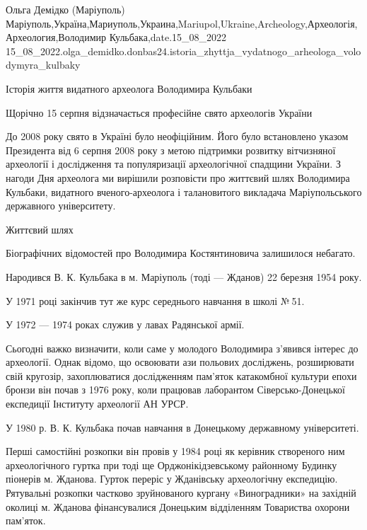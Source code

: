  
 
 
 
 

Ольга Демідко (Маріуполь)
Маріуполь,Україна,Мариуполь,Украина,Mariupol,Ukraine,Archeology,Археологія,Археология,Володимир Кульбака,date.15_08_2022
15_08_2022.olga_demidko.donbas24.istoria_zhyttja_vydatnogo_arheologa_volodymyra_kulbaky

Історія життя видатного археолога Володимира Кульбаки

Щорічно 15 серпня відзначається професійне свято археологів України

До 2008 року свято в Україні було неофіційним. Його було встановлено указом
Президента від 6 серпня 2008 року з метою підтримки розвитку вітчизняної
археології і дослідження та популяризації археологічної спадщини України. З
нагоди Дня археолога ми вирішили розповісти про життєвий шлях Володимира
Кульбаки, видатного вченого-археолога і талановитого викладача Маріупольського
державного університету.

Життєвий шлях 

Біографічних відомостей про Володимира Костянтиновича залишилося небагато.

Народився В. К. Кульбака в м. Маріуполь (тоді — Жданов) 22 березня 1954 року.

У 1971 році закінчив тут же курс середнього навчання в школі № 51.

У 1972 — 1974 роках служив у лавах Радянської армії.

Сьогодні важко визначити, коли саме у молодого Володимира з'явився інтерес до
археології. Однак відомо, що освоювати ази польових досліджень, розширювати
свій кругозір, захоплюватися дослідженням пам'яток катакомбної культури епохи
бронзи він почав з 1976 року, коли працював лаборантом Сіверсько-Донецької
експедиції Інституту археології АН УРСР.

У 1980 р. В. К. Кульбака почав навчання в Донецькому державному університеті.

Перші самостійні розкопки він провів у 1984 році як керівник створеного ним
археологічного гуртка при тоді ще Орджонікідзевському районному Будинку
піонерів м. Жданова. Гурток переріс у Жданівську археологічну експедицію.
Рятувальні розкопки частково зруйнованого кургану «Виноградники» на західній
околиці м. Жданова фінансувалися Донецьким відділенням Товариства охорони
пам'яток.

